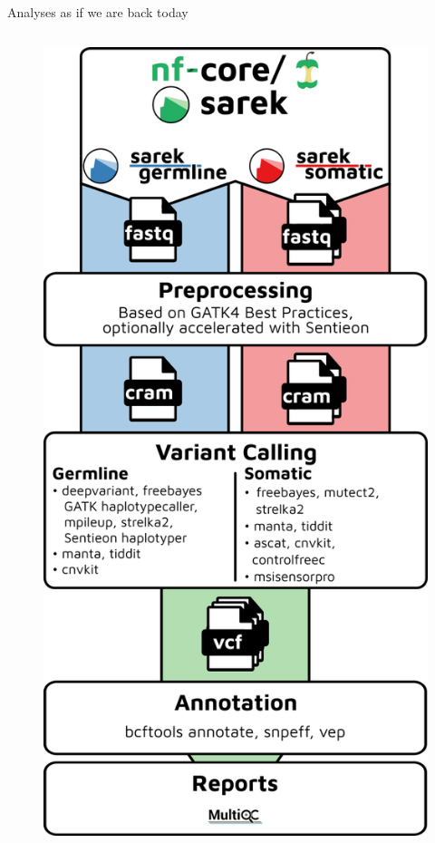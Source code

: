 \documentclass[10pt]{beamer}
\begin{document}
\begin{frame}{Analyses as if we are back today}
	\begin{columns}[T]
		\begin{figure}
			\includegraphics[width=\textwidth]{figures/sarek_workflow.png}

\end{figure}
\end{columns}
\end{frame}
\end{document}
